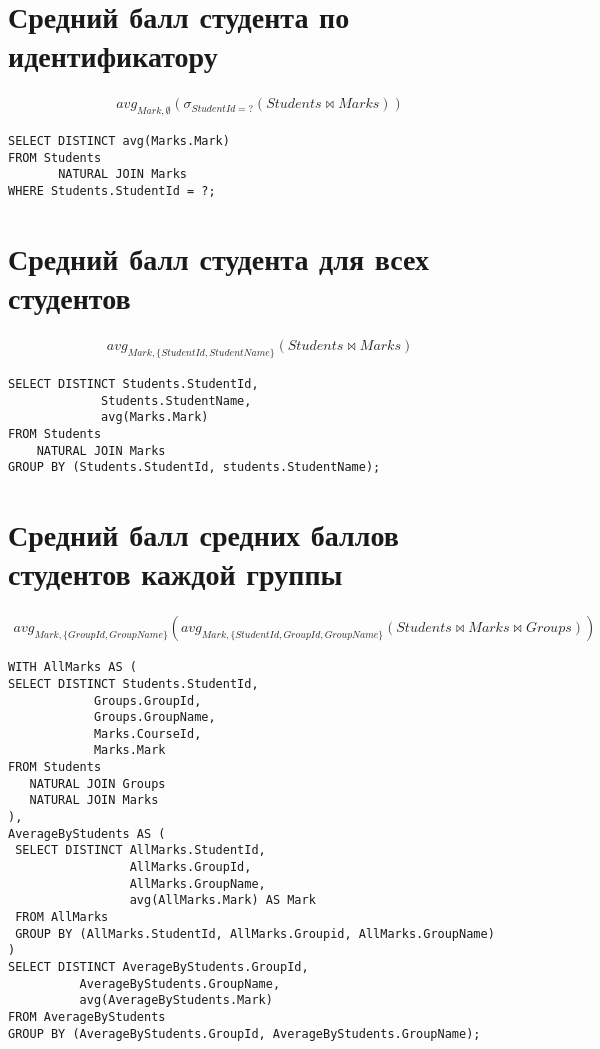 \documentclass{article}
\begin{document}
	\section{Средний балл студента по идентификатору}

	\begin{align*}
		 avg_{Mark, \emptyset}(\sigma_{StudentId = ?}(Students \bowtie Marks))
	\end{align*}

\begin{verbatim}
SELECT DISTINCT avg(Marks.Mark)
FROM Students
       NATURAL JOIN Marks
WHERE Students.StudentId = ?;
\end{verbatim}

	\section{Средний балл студента для всех студентов}
	
	\begin{align*}
		avg_{Mark, \{StudentId, StudentName\}}(Students \bowtie Marks)
	\end{align*}
	
\begin{verbatim}
SELECT DISTINCT Students.StudentId,
             Students.StudentName,
             avg(Marks.Mark)
FROM Students
    NATURAL JOIN Marks
GROUP BY (Students.StudentId, students.StudentName);
\end{verbatim}
	
	\section{Средний балл средних баллов студентов каждой группы}
	
	\begin{align*}
			avg_{Mark, \{GroupId, GroupName\}}(avg_{Mark, \{StudentId, GroupId, GroupName\}}(Students \bowtie Marks \bowtie Groups))
	\end{align*}
		
\begin{verbatim}
WITH AllMarks AS (
SELECT DISTINCT Students.StudentId,
            Groups.GroupId,
            Groups.GroupName,
            Marks.CourseId,
            Marks.Mark
FROM Students
   NATURAL JOIN Groups
   NATURAL JOIN Marks
),
AverageByStudents AS (
 SELECT DISTINCT AllMarks.StudentId,
                 AllMarks.GroupId,
                 AllMarks.GroupName,
                 avg(AllMarks.Mark) AS Mark
 FROM AllMarks
 GROUP BY (AllMarks.StudentId, AllMarks.Groupid, AllMarks.GroupName)
)
SELECT DISTINCT AverageByStudents.GroupId,
          AverageByStudents.GroupName,
          avg(AverageByStudents.Mark)
FROM AverageByStudents
GROUP BY (AverageByStudents.GroupId, AverageByStudents.GroupName);
\end{verbatim}
\end{document}
